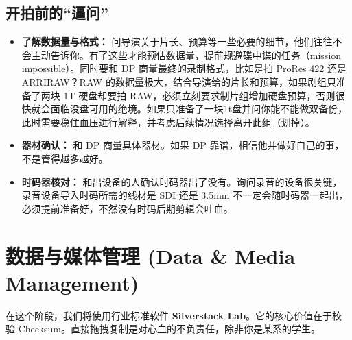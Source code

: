 \documentclass[10pt, a5paper]{article}
\begin{document}
\subsection{开拍前的“逼问”}
\begin{itemize}
    \item \textbf{了解数据量与格式：} 问导演关于片长、预算等一些必要的细节，他们往往不会主动告诉你。有了这些才能预估数据量，提前规避碟中谍的任务（mission impossible）。同时要和 DP 商量最终的录制格式，比如是拍 ProRes 422 还是 ARRIRAW？RAW 的数据量极大，结合导演给的片长和预算，如果剧组只准备了两块 1T 硬盘却要拍 RAW，必须立刻要求制片组增加硬盘预算，否则很快就会面临没盘可用的绝境。如果只准备了一块1t盘并问你能不能做双备份，此时需要稳住血压进行解释，并考虑后续情况选择离开此组（划掉）。
    \item \textbf{器材确认：} 和 DP 商量具体器材。如果 DP 靠谱，相信他并做好自己的事，不是管得越多越好。
    \item \textbf{时码器核对：} 和出设备的人确认时码器出了没有。询问录音的设备很关键，录音设备导入时码所需的线材是 SDI 还是 3.5mm 不一定会随时码器一起出，必须提前准备好，不然没有时码后期剪辑会吐血。
\end{itemize}


\newpage
\section{数据与媒体管理 (Data \& Media Management)}
\label{sec:data_management}

在这个阶段，我们将使用行业标准软件 \textbf{Silverstack Lab}。它的核心价值在于校验 Checksum。直接拖拽复制是对心血的不负责任，除非你是某系的学生。
\end{document}
